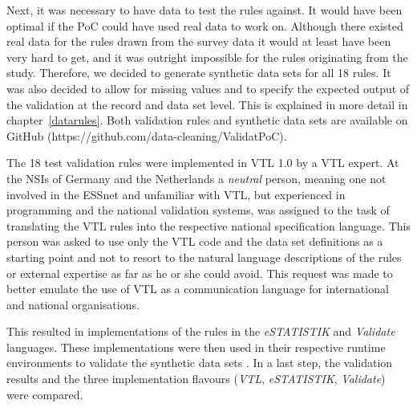 Next, it was necessary to have data to test the rules against. It would have been
optimal if the PoC could have used real data to work on. Although there existed real
data for the rules drawn from the survey data it would at least have been very hard to get, and
it was outright impossible for the rules originating from the study. Therefore, we
decided to generate synthetic data sets for all 18 rules. It was also decided to
allow for missing values and to specify the expected output of the validation at the
record and data set level. This is explained in more detail in chapter~\ref{datarules}.
Both validation rules and synthetic data sets are available on GitHub
(https://github.com/data-cleaning/ValidatPoC).

The 18 test validation rules were implemented in VTL 1.0 by a VTL expert. At the
NSIs of Germany and the Netherlands a \textit{neutral} person, meaning one not
involved in the ESSnet and unfamiliar with VTL, but experienced in programming
and the national validation systems, was assigned to the task of translating
the VTL rules into the respective national specification language. This person
was asked to use only the VTL code and the data set definitions as a starting
point and not to resort to the natural language descriptions of the rules or
external expertise as far as he or she could avoid. This request was made to
better emulate the use of VTL as a communication language for international
and national organisations.

This resulted in implementations of the rules in the \textit{eSTATISTIK} and
\textit{Validate} languages. These implementations were then used in their
respective runtime environments to validate the synthetic data sets . In a last
step, the validation results and the three implementation flavours (\textit{VTL},
\textit{eSTATISTIK}, \textit{Validate}) were compared.

